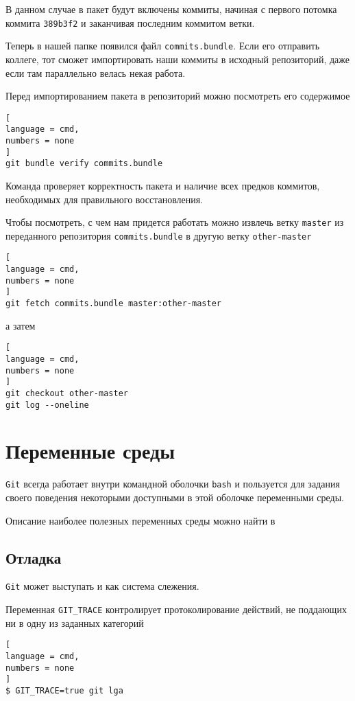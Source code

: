 \documentclass[%
	11pt,
	a4paper,
	utf8,
		]{article}
\begin{document}
В данном случае в пакет будут включены коммиты, начиная с первого потомка коммита \texttt{389b3f2} и заканчивая последним коммитом ветки.

Теперь в нашей папке появился файл \texttt{commits.bundle}. Если его отправить коллеге, тот сможет импортировать наши коммиты в исходный репозиторий, даже если там параллельно велась некая работа.

Перед импортированием пакета в репозиторий можно посмотреть его содержимое
\begin{lstlisting}[
language = cmd,
numbers = none
]
git bundle verify commits.bundle
\end{lstlisting}

Команда проверяет корректность пакета и наличие всех предков коммитов, необходимых для правильного восстановления.

Чтобы посмотреть, с чем нам придется работать можно извлечь ветку \texttt{master} из переданного репозитория \texttt{commits.bundle} в другую ветку \texttt{other-master}
\begin{lstlisting}[
language = cmd,
numbers = none
]
git fetch commits.bundle master:other-master
\end{lstlisting}
а затем
\begin{lstlisting}[
language = cmd,
numbers = none
]
git checkout other-master
git log --oneline
\end{lstlisting}

\section{Переменные среды}

\texttt{Git} всегда работает внутри командной оболочки \texttt{bash} и пользуется для задания своего поведения некоторыми доступными в этой оболочке переменными среды.

Описание наиболее полезных переменных среды можно найти в \cite[]{chacon:2020}

\subsection{Отладка}

\texttt{Git} может выступать и как система слежения.

Переменная \verb|GIT_TRACE| контролирует протоколирование действий, не поддающих ни в одну из заданных категорий
\begin{lstlisting}[
language = cmd,
numbers = none
]
$ GIT_TRACE=true git lga
\end{lstlisting}
\end{document}
